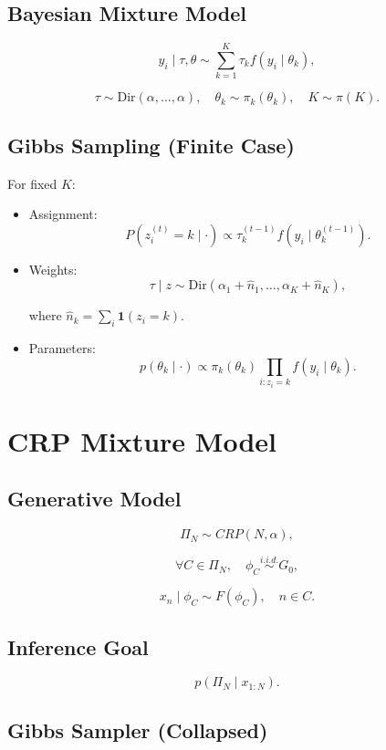 \documentclass[12pt,oneside]{book}
\numberwithin{equation}{section}
\theoremstyle{definition}
\theoremstyle{plain}
\theoremstyle{remark}
\begin{document}
\subsection{Bayesian Mixture Model}

\[
y_i \mid \tau,\theta \sim \sum_{k=1}^K \tau_k f(y_i \mid \theta_k),
\]

\[
\tau \sim \mathrm{Dir}(\alpha,\dots,\alpha),
\quad
\theta_k \sim \pi_k(\theta_k),
\quad
K \sim \pi(K).
\]

\subsection{Gibbs Sampling (Finite Case)}

For fixed $K$:

\begin{itemize}
\item Assignment:
\[
P(z_i^{(t)} = k \mid \cdot)
\propto
\tau_k^{(t-1)} f(y_i \mid \theta_k^{(t-1)}).
\]

\item Weights:
\[
\tau \mid z \sim \mathrm{Dir}(\alpha_1 + \hat n_1,\dots,\alpha_K + \hat n_K),
\]

where $\hat n_k = \sum_i \mathbf{1}(z_i = k)$.

\item Parameters:
\[
p(\theta_k \mid \cdot)
\propto
\pi_k(\theta_k)\prod_{i:z_i=k} f(y_i \mid \theta_k).
\]
\end{itemize}

\section{CRP Mixture Model}

\subsection*{Generative Model}

\[
\Pi_N \sim CRP(N,\alpha),
\]

\[
\forall C \in \Pi_N,\quad \phi_C \overset{i.i.d.}{\sim} G_0,
\]

\[
x_n \mid \phi_C \sim F(\phi_C), \quad n \in C.
\]

\subsection*{Inference Goal}

\[
p(\Pi_N \mid x_{1:N}).
\]

\subsection*{Gibbs Sampler (Collapsed)}
\end{document}

